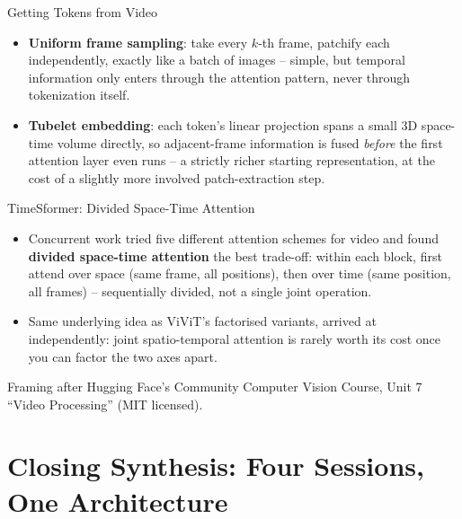 \begin{vbframe}{Getting Tokens from Video}
\begin{itemize}
  \item \textbf{Uniform frame sampling}: take every $k$-th frame, patchify each independently, exactly like a batch of images -- simple, but temporal information only enters through the attention pattern, never through tokenization itself.
  \item \textbf{Tubelet embedding}: each token's linear projection spans a small 3D space-time volume directly, so adjacent-frame information is fused \emph{before} the first attention layer even runs -- a strictly richer starting representation, at the cost of a slightly more involved patch-extraction step.
\end{itemize}
\end{vbframe}

\begin{vbframe}{TimeSformer: Divided Space-Time Attention}
\begin{itemize}
  \item Concurrent work  tried five different attention schemes for video and found \textbf{divided space-time attention} the best trade-off: within each block, first attend over space (same frame, all positions), then over time (same position, all frames) -- sequentially divided, not a single joint operation.
  \item Same underlying idea as ViViT's factorised variants, arrived at independently: joint spatio-temporal attention is rarely worth its cost once you can factor the two axes apart.
\end{itemize}
{\footnotesize Framing after Hugging Face's Community Computer Vision Course, Unit 7 \enquote{Video Processing} (MIT licensed).}
\end{vbframe}


\section{Closing Synthesis: Four Sessions, One Architecture}


